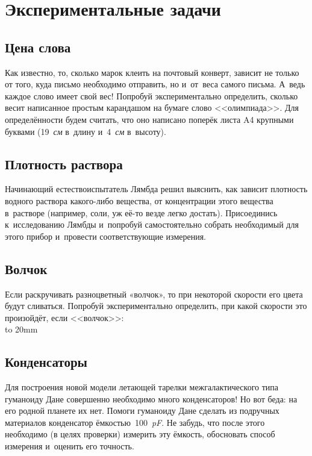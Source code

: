 \documentclass[a4paper,12pt]{article}
\begin{document}
\section{Экспериментальные задачи}

\subsection{Цена слова}
Как известно, то, сколько марок клеить на почтовый конверт, зависит не только от того,
куда письмо необходимо отправить, но и~от~веса самого письма. А~ведь каждое слово имеет
свой вес! Попробуй экспериментально определить, сколько весит написанное простым
карандашом на бумаге слово <<олимпиада>>. Для определённости будем считать, что
оно написано поперёк листа A4 крупными буквами (19~\emph{см} в~длину и~4~\emph{см} в~высоту).

\subsection{Плотность раствора}
Начинающий естествоиспытатель Лямбда решил выяснить, как зависит плотность
водного раствора какого-либо вещества, от концентрации этого вещества
в~растворе (например, соли, уж её-то везде легко достать). Присоединись
к~исследованию Лямбды и~попробуй самостоятельно собрать необходимый
для этого прибор и~провести соответствующие измерения.

\subsection{Волчок}
Если раскручивать разноцветный «волчок», то при некоторой скорости его цвета будут сливаться.
Попробуй экспериментально определить, при какой скорости это произойдёт, если <<волчок>>:\\
\vbox to 20mm{
\vss
{}
\vss}

\subsection{Конденсаторы}
Для построения новой модели летающей тарелки межгалактического типа гуманоиду Дане
совершенно необходимо много конденсаторов! Но вот беда: на его родной планете их нет.
Помоги гуманоиду Дане сделать из подручных материалов конденсатор ёмкостью~100~\emph{pF}.
Не забудь, что после этого необходимо (в  целях проверки) измерить эту ёмкость,
обосновать способ измерения и~оценить его точность.
\end{document}
